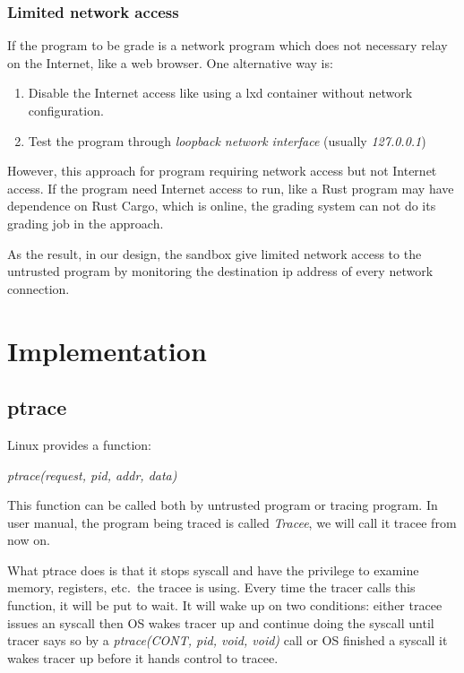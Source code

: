 \documentclass[conference,compsoc]{IEEEtran}
\begin{document}
		\subsubsection{Limited network access}
	If the program to be grade is a network program which does not necessary relay on the Internet, like a web browser. One alternative way is:
	\par
	\begin{enumerate}
		\item{Disable the Internet access like using a lxd container without network configuration.}
		\item{Test the program through \emph{loopback network interface} (usually \emph{127.0.0.1})}
	\end{enumerate}
	\par
	However, this approach for program requiring network access but not Internet access. If the program need Internet access to run, like a Rust program may have dependence on Rust Cargo, which is online, the grading system can not do its grading job in the approach.
	\par
	As the result, in our design, the sandbox give limited network access to the untrusted program by monitoring the destination ip address of every network connection.

\section{Implementation}
	\subsection{ptrace}
		\par
			Linux provides a function:\\
				\begin{center}
				\emph{ptrace(request, pid, addr, data)}
				\end{center}
			This function can be called both by untrusted program or tracing program. 
			In user manual, the program being traced is called \emph{Tracee}, we will call it tracee from now on.
		\par 
			What ptrace does is that it stops syscall and have the privilege to examine memory, registers, etc.\ the tracee is using. 
			Every time the tracer calls this function, it will be put to wait. 
			It will wake up on two conditions: either tracee issues an syscall then OS wakes tracer up and continue doing the syscall until tracer says so by a \emph{ptrace(CONT, pid, void, void)} call or OS finished a syscall it wakes tracer up before it hands control to tracee.
\end{document}
